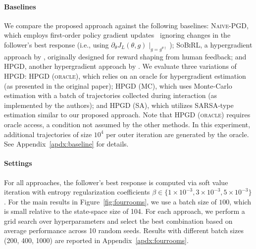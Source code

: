 \documentclass[letterpaper]{article} %
\begin{document}
\paragraph{Baselines}
We compare the proposed approach against the following baselines: \textsc{Naive-PGD}, which employs first-order policy gradient updates~\citep{Rajeswaran2020-gv,Vu2022-jq} ignoring changes in the follower's best response (i.e., using $\partial_{\theta} J_L(\theta, g)\mid_{g = g^{\theta\dagger}}$); \textsc{SoBiRL}, a hypergradient approach by \citet{Yang2025-lr}, originally designed for reward shaping from human feedback; and \textsc{HPGD}, another hypergradient approach by \citet{Thoma2024-em}. 
We evaluate three variations of \textsc{HPGD}: \textsc{HPGD (oracle)}, which relies on an oracle for hypergradient estimation (as presented in the original paper); \textsc{HPGD (MC)}, which uses Monte-Carlo estimation with a batch of trajectories collected during interaction (as implemented by the authors); and \textsc{HPGD (SA)}, which utilizes SARSA-type estimation similar to our proposed approach. 
Note that \textsc{HPGD (oracle)} requires oracle access, a condition not assumed by the other methods. 
In this experiment, additional trajectories of size $10^4$ per outer iteration are generated by the oracle.
See Appendix~\ref{apdx:baseline} for details.

\paragraph{Settings}
For all approaches, the follower's best response is computed via soft value iteration with entropy regularization coefficients $\beta\in\{1\times10^{-3}, 3\times10^{-3}, 5\times10^{-3}\}$.
For the main results in Figure~\ref{fig:fourrooms}, we use a batch size of $100$, which is small relative to the state-space size of 104.
For each approach, we perform a grid search over hyperparameters and select the best combination based on average performance across 10 random seeds.
Results with different batch sizes (200, 400, 1000) are reported in Appendix~\ref{apdx:fourrooms}.
\end{document}
